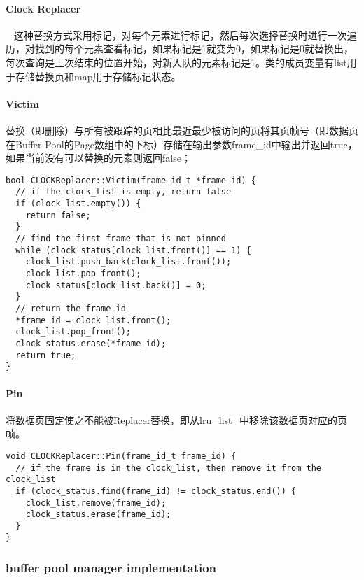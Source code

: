 \documentclass[12pt,hyperref,a4paper,UTF8]{ctexart}
\begin{document}
\paragraph{Clock Replacer}~{}
这种替换方式采用标记，对每个元素进行标记，然后每次选择替换时进行一次遍历，对找到的每个元素查看标记，如果标记是1就变为0，如果标记是0就替换出，每次查询是上次结束的位置开始，对新入队的元素标记是1。类的成员变量有list用于存储替换页和map用于存储标记状态。
  
\paragraph{Victim} 
替换（即删除）与所有被跟踪的页相比最近最少被访问的页将其页帧号（即数据页在Buffer Pool的Page数组中的下标）存储在输出参数frame\_id中输出并返回true，如果当前没有可以替换的元素则返回false；
\begin{verbatim}
bool CLOCKReplacer::Victim(frame_id_t *frame_id) {
  // if the clock_list is empty, return false
  if (clock_list.empty()) {
    return false;
  }
  // find the first frame that is not pinned
  while (clock_status[clock_list.front()] == 1) {
    clock_list.push_back(clock_list.front());
    clock_list.pop_front();
    clock_status[clock_list.back()] = 0;
  }
  // return the frame_id
  *frame_id = clock_list.front();
  clock_list.pop_front();
  clock_status.erase(*frame_id);
  return true;
}
\end{verbatim}

\paragraph{Pin}
将数据页固定使之不能被Replacer替换，即从lru\_list\_中移除该数据页对应的页帧。
\begin{verbatim}
void CLOCKReplacer::Pin(frame_id_t frame_id) {
  // if the frame is in the clock_list, then remove it from the clock_list
  if (clock_status.find(frame_id) != clock_status.end()) {
    clock_list.remove(frame_id);
    clock_status.erase(frame_id);
  }
}

\end{verbatim}

\subsubsection{buffer pool manager implementation}
\end{document}
